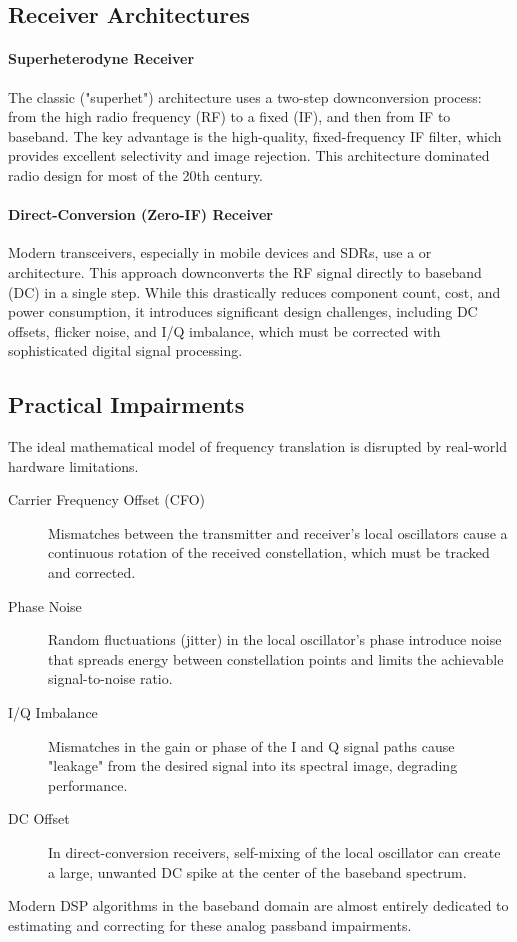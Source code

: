 \subsection{Receiver Architectures}

\paragraph{Superheterodyne Receiver}
The classic  ("superhet") architecture uses a two-step downconversion process: from the high radio frequency (RF) to a fixed  (IF), and then from IF to baseband. The key advantage is the high-quality, fixed-frequency IF filter, which provides excellent selectivity and image rejection. This architecture dominated radio design for most of the 20th century.

\paragraph{Direct-Conversion (Zero-IF) Receiver}
Modern transceivers, especially in mobile devices and SDRs, use a  or  architecture. This approach downconverts the RF signal directly to baseband (DC) in a single step. While this drastically reduces component count, cost, and power consumption, it introduces significant design challenges, including DC offsets, flicker noise, and I/Q imbalance, which must be corrected with sophisticated digital signal processing.

\subsection{Practical Impairments}

The ideal mathematical model of frequency translation is disrupted by real-world hardware limitations.
\begin{description}
    \item[Carrier Frequency Offset (CFO)] Mismatches between the transmitter and receiver's local oscillators cause a continuous rotation of the received constellation, which must be tracked and corrected.
    \item[Phase Noise] Random fluctuations (jitter) in the local oscillator's phase introduce noise that spreads energy between constellation points and limits the achievable signal-to-noise ratio.
    \item[I/Q Imbalance] Mismatches in the gain or phase of the I and Q signal paths cause "leakage" from the desired signal into its spectral image, degrading performance.
    \item[DC Offset] In direct-conversion receivers, self-mixing of the local oscillator can create a large, unwanted DC spike at the center of the baseband spectrum.
\end{description}
Modern DSP algorithms in the baseband domain are almost entirely dedicated to estimating and correcting for these analog passband impairments.

